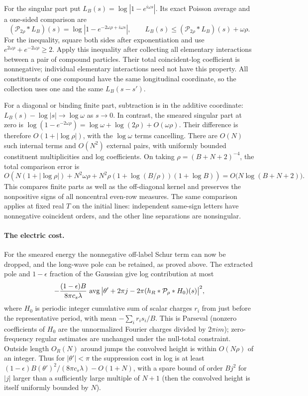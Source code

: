 For the singular part put $L_B(s)=\log|1-e^{i\omega s}|$.  Its exact
Poisson average and a one-sided comparison are
\[
 (\mathcal P_{2\rho}*L_B)(s)
   =\log|1-e^{-2\omega\rho+i\omega s}|,
 \qquad L_B(s)\le(\mathcal P_{2\rho}*L_B)(s)+\omega\rho.
\]
For the inequality, square both sides after exponentiation and use
$e^{2\omega\rho}+e^{-2\omega\rho}\ge2$.
Apply this inequality after collecting all elementary interactions
between a pair of compound particles.  Their total coincident-log
coefficient is nonnegative; individual elementary interactions need
not have this property.  All constituents of one compound have the
same longitudinal coordinate, so the collection uses one and the
same $L_B(s-s')$.

For a diagonal or binding finite part, subtraction is in the additive
coordinate: $L_B(s)-\log|s|\to\log\omega$ as $s\to0$.  In contrast,
the smeared singular part at zero is
$\log(1-e^{-2\omega\rho})=\log\omega+\log(2\rho)+O(\omega\rho)$.
Their difference is therefore $O(1+|\log\rho|)$, with the
$\log\omega$ terms cancelling.  There are $O(N)$ such internal terms
and $O(N^2)$ external pairs, with uniformly bounded constituent
multiplicities and log coefficients.  On taking
$\rho=(B+N+2)^{-4}$, the total comparison error is
\[
 O\!\left(N(1+|\log\rho|)
   +N^2\omega\rho
   +N^2\rho(1+\log(B/\rho))(1+\log B)\right)
 =O\bigl(N\log(B+N+2)\bigr).
\]
This compares finite parts as well as the off-diagonal kernel and
preserves the nonpositive signs of all noncentral even-row measures.
The same comparison applies at fixed real \(T\) on the initial lines:
independent same-sign letters have nonnegative coincident orders, and the
other line separations are nonsingular.

\paragraph{The electric cost.}
For the smeared energy the nonnegative off-label Schur term can now be
dropped, and the long-wave pole can be retained, as proved above. The extracted pole and \(1-\epsilon\) fraction of the Gaussian give log contribution at most
\[
 -\frac{(1-\epsilon)B}{8\pi c_s\lambda}\,
 \mathop{\rm avg}\big|\theta'+2\pi j-2\pi(h_R*\mathcal P_\rho*H_0)(s)\big|^2 ,
\]
where \(H_0\) is periodic integer cumulative sum of scalar charges \(r_i\) from just before the representative period, with mean \(-\sum_i r_i s_i/B\). This is Parseval (nonzero coefficients of \(H_0\) are the unnormalized Fourier charges divided by \(2\pi i m\)); zero-frequency regular estimates are unchanged under the null-total constraint. Outside length \(O_R(N)\) around jumps the convolved height is within \(O(N\rho)\) of an integer. Thus for \(|\theta'|<\pi\) the suppression cost in log is at least \((1-\epsilon)B(\theta')^2/(8\pi c_s\lambda)-O(1+N)\), with a spare bound of order \(Bj^2\) for \(|j|\) larger than a sufficiently large multiple of \(N+1\) (then the convolved height is itself uniformly bounded by \(N\)).

